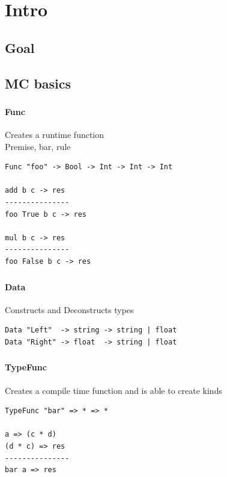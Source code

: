 \section{Intro}
\subsection{Goal}

\subsection{MC basics}

\begin{frame}[fragile]
   \frametitle{\subsecname}
   \framesubtitle{Func}

   Creates a runtime function\\
   Premise, bar, rule
   \begin{lstlisting}
Func "foo" -> Bool -> Int -> Int -> Int

add b c -> res
---------------
foo True b c -> res

mul b c -> res
---------------
foo False b c -> res
   \end{lstlisting}
\end{frame}

\begin{frame}[fragile]
   \frametitle{\subsecname}
   \framesubtitle{Data}

   Constructs and Deconstructs types
   \begin{lstlisting}
Data "Left"  -> string -> string | float
Data "Right" -> float  -> string | float
   \end{lstlisting}
\end{frame}

\begin{frame}[fragile]
   \frametitle{\subsecname}
   \framesubtitle{TypeFunc}

   Creates a compile time function and is able to create kinds
   \begin{lstlisting}
TypeFunc "bar" => * => *

a => (c * d)
(d * c) => res
---------------
bar a => res
   \end{lstlisting}
\end{frame}

